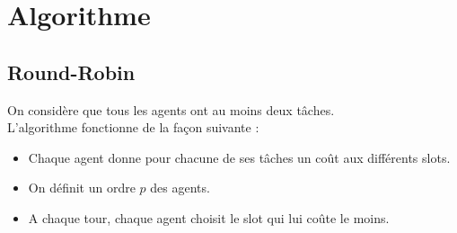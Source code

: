\documentclass[12pt]{article}
\theoremstyle{definition}
\begin{document}
\section{Algorithme}
\subsection{Round-Robin}
\noindent
On considère que tous les agents ont au moins deux tâches.\\
L'algorithme fonctionne de la façon suivante :
\begin{itemize}
	\item Chaque agent donne pour chacune de ses tâches un coût aux différents slots.
	\item On définit un ordre $p$ des agents.
	\item A chaque tour, chaque agent choisit le slot qui lui coûte le moins.
\end{itemize}
\end{document}
